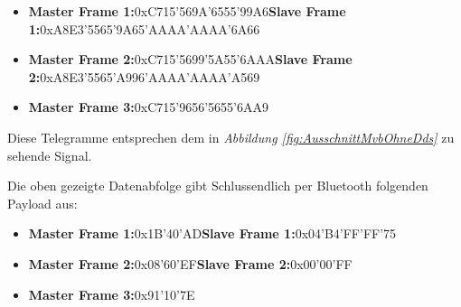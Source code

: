 \begin{itemize}
  \item \textbf{Master Frame 1:}\hspace{0.5cm}0xC715'569A'6555'99A6\newline\textbf{Slave Frame 1:}\hspace{0.75cm}0xA8E3'5565'9A65'AAAA'AAAA'6A66
  \item \textbf{Master Frame 2:}\hspace{0.5cm}0xC715'5699'5A55'6AAA\newline\textbf{Slave Frame 2:}\hspace{0.75cm}0xA8E3'5565'A996'AAAA'AAAA'A569
  \item \textbf{Master Frame 3:}\hspace{0.5cm}0xC715'9656'5655'6AA9
\end{itemize}

Diese Telegramme entsprechen dem in \textit{Abbildung \ref{fig:AusschnittMvbOhneDds}} zu sehende Signal.

Die oben gezeigte Datenabfolge gibt Schlussendlich per Bluetooth folgenden Payload aus:

\begin{itemize}
  \item \textbf{Master Frame 1:}\hspace{0.5cm}0x1B'40'AD\hspace{1.5cm}\textbf{Slave Frame 1:}\hspace{0.5cm}0x04'B4'FF'FF'75
  \item \textbf{Master Frame 2:}\hspace{0.5cm}0x08'60'EF\hspace{1.7cm}\textbf{Slave Frame 2:}\hspace{0.5cm}0x00'00'FF
  \item \textbf{Master Frame 3:}\hspace{0.5cm}0x91'10'7E
\end{itemize}
